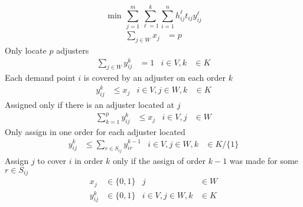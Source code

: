 {\small
  \begin{equation}
    \min \, \sum_{j=1}^{m}{
      \sum_{\ell=1}^{k}{
        \sum_{i=1}^{n}{
          h_{ij}^{\ell}t_{ij}y_{ij}^{\ell}
        }
      }
    }
  \end{equation}
}
\begin{align}
  \label{eq:2}
  \sum_{j \in W}{x_j} 
  & = p
\end{align}
Only locate $p$ adjusters  
\begin{align}
  \label{eq:3}
  \sum_{j \in W}{y_{ij}^{k}}
  & = 1
  & i \in V, k 
  &\in K
\end{align}
Each demand point $i$ is covered by an adjuster on each order $k$
\begin{align}
  \label{eq:4}
  y_{ij}^{k}
  & \leq x_j
  & i \in V,j \in W, k
  &\in K
\end{align}
Assigned only if there is an adjuster located at $j$
\begin{align}
  \label{eq:5}
  \sum_{k = 1}^{p}{
    y_{ij}^{k}
  }
  & \leq x_j
  & i \in V, j 
  & \in W
\end{align}
Only assign in one order for each adjuster located 
\begin{align}
  y_{ij}^{k} 
  & \leq \sum_{r\in S_{ij}}{y_{ir}^{k-1}}
  & i \in V,j \in W, k 
  & \in K/\{1\}
\end{align}
Assign $j$ to cover $i$ in order $k$
only if
the assign of order $k-1$
was made for some  $r \in S_{ij}$
\begin{align}
  x_{j}
  & \in \{0,1\}
  & j 
  & \in W \nonumber
  \\
  y_{ij}^{k}
  & \in \{0,1\}
  &  i \in V,j \in W,k
  &\in K \nonumber
\end{align}

%
